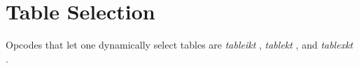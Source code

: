 \begin{comment}
\documentclass[10pt]{article}
\usepackage{fullpage, graphicx, url}
\setlength{\parskip}{1ex}
\setlength{\parindent}{0ex}
\title{Table Selection}



\begin{tabular}{ccc}
The Alternative Csound Reference Manual & & \\
Previous &Function Table Control &Next

\end{tabular}

\end{comment}
\section{Table Selection}


  Opcodes that let one dynamically select tables are \emph{tableikt}
, \emph{tablekt}
, and \emph{tablexkt}
. 


\begin{comment}
\begin{tabular}{lcr}
Previous &Home &Next \\
Read/Write Operations &Up &Mathematical Operations

\end{tabular}



\end{comment}
